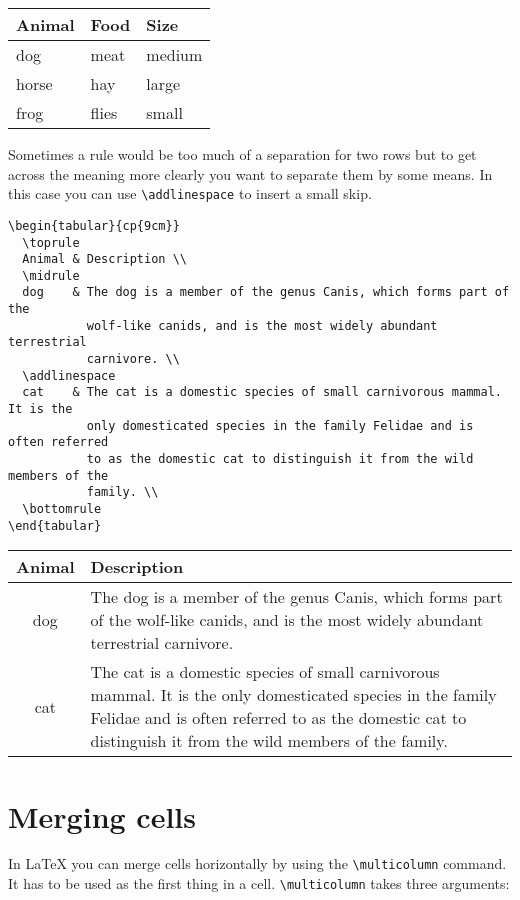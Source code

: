 \documentclass{article}
\begin{document}
\begin{tabular}{lll}
  \toprule
  Animal & Food  & Size   \\
  \midrule
  dog    & meat  & medium \\
  \cmidrule{1-2}
  horse  & hay   & large  \\
  \cmidrule{1-1}
  \cmidrule{3-3}
  frog   & flies & small  \\
  \bottomrule
\end{tabular}
\vspace{0.5cm}

Sometimes a rule would be too much of a separation for two rows but to get across the meaning more clearly you want to separate them by some means. In this case you can use \verb|\addlinespace| to insert a small skip.

\begin{verbatim}
\begin{tabular}{cp{9cm}}
  \toprule
  Animal & Description \\
  \midrule
  dog    & The dog is a member of the genus Canis, which forms part of the
           wolf-like canids, and is the most widely abundant terrestrial
           carnivore. \\
  \addlinespace
  cat    & The cat is a domestic species of small carnivorous mammal. It is the
           only domesticated species in the family Felidae and is often referred
           to as the domestic cat to distinguish it from the wild members of the
           family. \\
  \bottomrule
\end{tabular}
\end{verbatim}

\begin{tabular}{cp{9cm}}
  \toprule
  Animal & Description \\
  \midrule
  dog    & The dog is a member of the genus Canis, which forms part of the
           wolf-like canids, and is the most widely abundant terrestrial
           carnivore. \\
  \addlinespace
  cat    & The cat is a domestic species of small carnivorous mammal. It is the
           only domesticated species in the family Felidae and is often referred
           to as the domestic cat to distinguish it from the wild members of the
           family. \\
  \bottomrule
\end{tabular}

\section{Merging cells}
In LaTeX you can merge cells horizontally by using the \verb|\multicolumn| command. It has to be used as the first thing in a cell. \verb|\multicolumn| takes three arguments:
\end{document}
